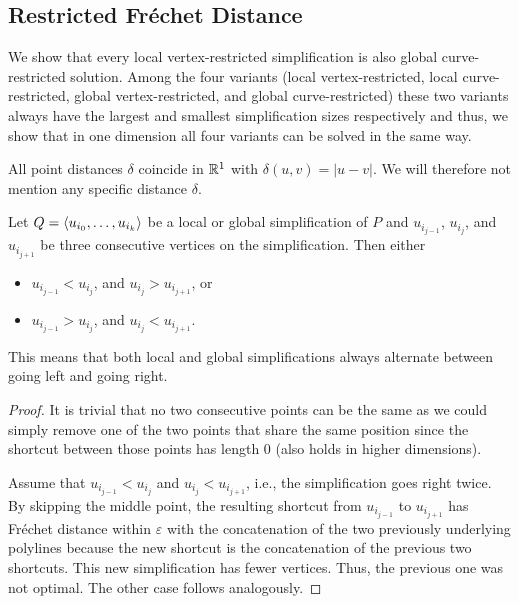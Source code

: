\subsection{Restricted Fréchet Distance}
We show that every local vertex-restricted simplification is also global curve-restricted solution. Among the four variants (local vertex-restricted, local curve-restricted, global vertex-restricted, and global curve-restricted) these two variants always have the largest and smallest simplification sizes respectively and thus, we show that in one dimension all four variants can be solved in the same way.

\begin{observation}
	All point distances \(\delta\) coincide in \(\mathbb{R}^1\) with \(\delta(u, v) = |u-v|\). We will therefore not mention any specific distance \(\delta\).
\end{observation}

\begin{lemma}[Zigzag]\label{lem:zigzag}
  Let \(Q = \left\langle u_{i_0}, \dots, u_{i_k}\right\rangle\) be a local or global simplification of \(P\) and \(u_{i_{j-1}}\), \(u_{i_{j}}\), and \(u_{i_{j+1}}\) be three consecutive vertices on the simplification. Then either
	\begin{itemize}
	  \item \(u_{i_{j-1}} < u_{i_{j}}\), and \(u_{i_{j}} > u_{i_{j+1}}\), or 
	  \item \(u_{i_{j-1}} > u_{i_{j}}\), and \(u_{i_{j}} < u_{i_{j+1}}\).
	\end{itemize}

	This means that both local and global simplifications always alternate between going left and going right.
\end{lemma}

\begin{proof}
  It is trivial that no two consecutive points can be the same as we could simply remove one of the two points that share the same position since the shortcut between those points has length 0 (also holds in higher dimensions). 

	Assume that \(u_{i_{j-1}} < u_{i_{j}}\) and \(u_{i_{j}} < u_{i_{j+1}}\), i.e., the simplification goes right twice. By skipping the middle point, the resulting shortcut from \(u_{i_{j-1}}\) to \(u_{i_{j+1}}\) has Fréchet distance within \(\varepsilon\) with the concatenation of the two previously underlying polylines because the new shortcut is the concatenation of the previous two shortcuts. This new simplification has fewer vertices. Thus, the previous one was not optimal. The other case follows analogously. 
\end{proof}

